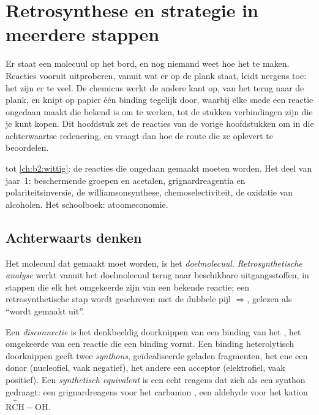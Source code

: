 \chapter{Retrosynthese en strategie in meerdere stappen}\label{ch:b2:retrosynthesis}

Er staat een molecuul op het bord, en nog niemand weet hoe het te maken. Reacties vooruit uitproberen, vanuit
wat er op de plank staat, leidt nergens toe: het zijn er te veel. De chemicus werkt de andere kant op, van het
 terug naar de plank, en knipt op papier één binding tegelijk door, waarbij elke snede een reactie ongedaan maakt die
bekend is om te werken, tot de stukken verbindingen zijn die je kunt kopen. Dit hoofdstuk zet de reacties van
de vorige hoofdstukken om in die achterwaartse redenering, en vraagt dan hoe de route die ze oplevert te beoordelen.

\begin{recall}
 tot \cref{ch:b2:wittig}: de reacties die ongedaan gemaakt moeten worden. Het deel van jaar~1:
beschermende groepen en acetalen, grignardreagentia en polariteitsinversie, de williamsonsynthese,
chemoselectiviteit, de oxidatie van alcoholen. Het schoolboek: atoomeconomie.
\end{recall}

\section{Achterwaarts denken}

\begin{definition}\label{def:b2:retrosynthesis:analysis}
Het molecuul dat gemaakt moet worden, is het \emph{doelmolecuul}. \emph{Retrosynthetische analyse}
 werkt vanuit het doelmolecuul terug naar beschikbare uitgangsstoffen,
in stappen die elk het omgekeerde zijn van een bekende reactie; een retrosynthetische stap wordt geschreven met de
dubbele pijl $\Rightarrow$, gelezen als ``wordt gemaakt uit''.
\end{definition}

\begin{definition}\label{def:b2:retrosynthesis:disconnection}
Een \emph{disconnectie} is het denkbeeldig doorknippen van een binding van het , het
omgekeerde van een reactie die een binding vormt. Een binding heterolytisch doorknippen geeft twee \emph{synthons},
geïdealiseerde geladen fragmenten, het ene een donor (nucleofiel, vaak negatief), het andere een acceptor
(elektrofiel, vaak positief). Een \emph{synthetisch equivalent} is een echt
reagens dat zich als een synthon gedraagt: een grignardreagens voor het carbanion , een aldehyde voor het
kation $\mathrm{R\overset{+}{C}H{-}OH}$.
\end{definition}

